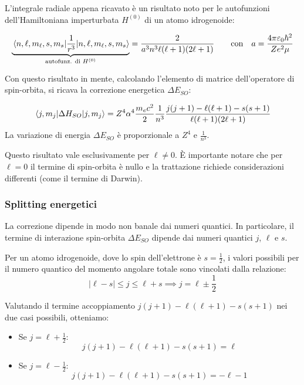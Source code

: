 L'integrale radiale appena ricavato è un risultato noto per le autofunzioni dell'Hamiltoniana imperturbata \(H^{(0)}\) di un atomo idrogenoide:

\begin{equation}
    \underbrace{\mel{n, \ell, m_{\ell}, s, m_s}{\frac{1}{r^3}}{n, \ell, m_{\ell}, s, m_s}}_{\text{autofunz. di } H^{(0)}} = \frac{2}{a^3 n^3 \ell(\ell+1)(2\ell+1)} \qquad \text{con} \quad a = \frac{4\pi \varepsilon_0 \hbar^2}{Z e^2 \mu}
\end{equation}

Con questo risultato in mente, calcolando l'elemento di matrice dell'operatore di spin-orbita, si ricava la correzione energetica \(\Delta E_{SO}\):

\begin{equation}
    \mel{j, m_j}{\Delta H_{SO}}{j, m_j} = Z^4 \alpha^4 \frac{m_e c^2}{2} \frac{1}{n^3} \frac{j(j+1) - \ell(\ell+1) - s(s+1)}{\ell(\ell+1)(2\ell+1)}
\end{equation}
La variazione di energia \(\Delta E_{SO}\) è proporzionale a \(Z^4\) e \(\frac{1}{n^3}\).

\begin{attention}
    Questo risultato vale esclusivamente per \(\ell \neq 0\). È importante notare che per \(\ell = 0\) il termine di spin-orbita è nullo e la trattazione richiede considerazioni differenti (come il termine di Darwin).
\end{attention}

\subsubsection{Splitting energetici}

La correzione dipende in modo non banale dai numeri quantici. In particolare, il termine di interazione spin-orbita \( \Delta E_{SO} \) dipende dai numeri quantici \( j \), \( \ell \) e \( s \).

Per un atomo idrogenoide, dove lo spin dell'elettrone è \( s = \frac{1}{2} \), i valori possibili per il numero quantico del momento angolare totale sono vincolati dalla relazione:
\begin{equation}
    |\ell - s| \le j \le \ell + s \implies j = \ell \pm \frac{1}{2}
\end{equation}

Valutando il termine accoppiamento \( j(j+1) - \ell(\ell+1) - s(s+1) \) nei due casi possibili, otteniamo:
\begin{itemize}
    \item Se \( j = \ell + \frac{1}{2} \):
    \begin{equation*}
        j(j+1) - \ell(\ell+1) - s(s+1) = \ell
    \end{equation*}
    \item Se \( j = \ell - \frac{1}{2} \):
    \begin{equation*}
        j(j+1) - \ell(\ell+1) - s(s+1) = -\ell - 1
    \end{equation*}
\end{itemize}

